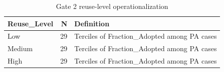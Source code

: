 \begin{table}
\caption{Gate 2 reuse-level operationalization}
\label{tab:gate2-reuse-levels}
\begin{tabular}{lrl}
\toprule
Reuse\_Level & N & Definition \\
\midrule
Low & 29 & Terciles of Fraction\_Adopted among PA cases \\
Medium & 29 & Terciles of Fraction\_Adopted among PA cases \\
High & 29 & Terciles of Fraction\_Adopted among PA cases \\
\bottomrule
\end{tabular}
\end{table}
